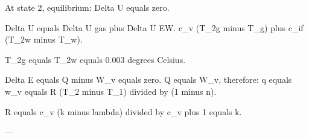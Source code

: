 At state 2, equilibrium:  
Delta U equals zero.  

Delta U equals Delta U gas plus Delta U EW.  
c_v (T_2g minus T_g) plus c_if (T_2w minus T_w).  

T_2g equals T_2w equals 0.003 degrees Celsius.  

Delta E equals Q minus W_v equals zero.  
Q equals W_v, therefore:  
q equals w_v equals R (T_2 minus T_1) divided by (1 minus n).  

R equals c_v (k minus lambda) divided by c_v plus 1 equals k.  

---